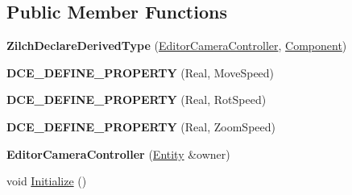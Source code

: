\subsection*{Public Member Functions}
\begin{DoxyCompactItemize}
\item 
\hypertarget{classDCEngine_1_1Components_1_1EditorCameraController_a2ebbaceafbc264fcfec471d3697c5ecd}{{\bfseries Zilch\-Declare\-Derived\-Type} (\hyperlink{classDCEngine_1_1Components_1_1EditorCameraController}{Editor\-Camera\-Controller}, \hyperlink{classDCEngine_1_1Component}{Component})}\label{classDCEngine_1_1Components_1_1EditorCameraController_a2ebbaceafbc264fcfec471d3697c5ecd}

\item 
\hypertarget{classDCEngine_1_1Components_1_1EditorCameraController_a5b461a9365e428f83d0f661899f9a859}{{\bfseries D\-C\-E\-\_\-\-D\-E\-F\-I\-N\-E\-\_\-\-P\-R\-O\-P\-E\-R\-T\-Y} (Real, Move\-Speed)}\label{classDCEngine_1_1Components_1_1EditorCameraController_a5b461a9365e428f83d0f661899f9a859}

\item 
\hypertarget{classDCEngine_1_1Components_1_1EditorCameraController_ab3ed0ec14ef4c9b849efbb7b2310e6d5}{{\bfseries D\-C\-E\-\_\-\-D\-E\-F\-I\-N\-E\-\_\-\-P\-R\-O\-P\-E\-R\-T\-Y} (Real, Rot\-Speed)}\label{classDCEngine_1_1Components_1_1EditorCameraController_ab3ed0ec14ef4c9b849efbb7b2310e6d5}

\item 
\hypertarget{classDCEngine_1_1Components_1_1EditorCameraController_a0ef29bd91540b99c4d32b5507c9e1c7a}{{\bfseries D\-C\-E\-\_\-\-D\-E\-F\-I\-N\-E\-\_\-\-P\-R\-O\-P\-E\-R\-T\-Y} (Real, Zoom\-Speed)}\label{classDCEngine_1_1Components_1_1EditorCameraController_a0ef29bd91540b99c4d32b5507c9e1c7a}

\item 
\hypertarget{classDCEngine_1_1Components_1_1EditorCameraController_ab0b3fb16ca4bdf1ae8f54fe2026c348f}{{\bfseries Editor\-Camera\-Controller} (\hyperlink{classDCEngine_1_1Entity}{Entity} \&owner)}\label{classDCEngine_1_1Components_1_1EditorCameraController_ab0b3fb16ca4bdf1ae8f54fe2026c348f}

\item 
\hypertarget{classDCEngine_1_1Components_1_1EditorCameraController_a4e820d4b60712d5d57153a29dffd7cb0}{void \hyperlink{classDCEngine_1_1Components_1_1EditorCameraController_a4e820d4b60712d5d57153a29dffd7cb0}{Initialize} ()}\label{classDCEngine_1_1Components_1_1EditorCameraController_a4e820d4b60712d5d57153a29dffd7cb0}


\end{DoxyCompactItemize}
